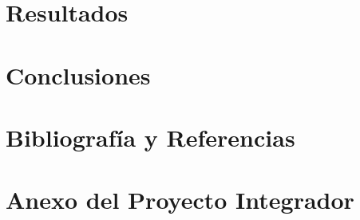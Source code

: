 \documentclass[12pt,a4paper,oneside]{book}
\begin{document}
\part{Resultados}
\clearpage
\null

\clearpage
\null
\part{Conclusiones}
\clearpage
\null

\clearpage
\null
\part{Bibliografía y Referencias}
\backmatter %


\clearpage
\null
\part{Anexo del Proyecto Integrador}
\end{document}
